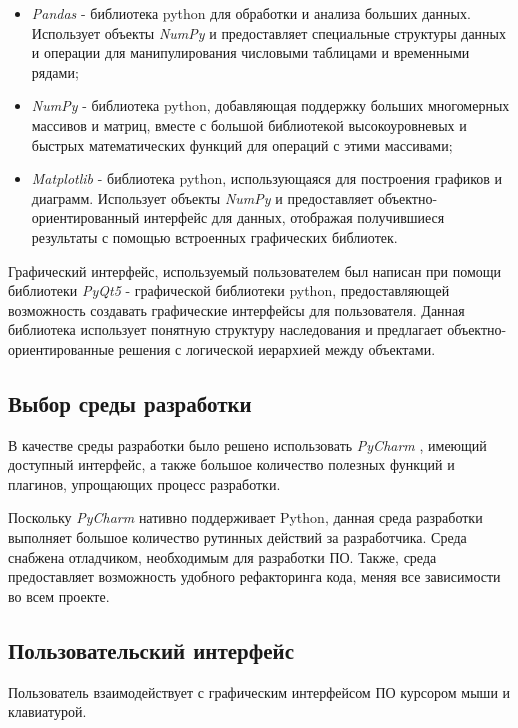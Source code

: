 \documentclass[utf8x, 14pt, oneside, a4paper]{article}
\begin{document}
	\begin{itemize}
		\item \textit{Pandas} - библиотека python для обработки и анализа больших данных. Использует объекты \textit{NumPy} и предоставляет специальные структуры данных и операции для манипулирования числовыми таблицами и временными рядами;
		\item \textit{NumPy} - библиотека python, добавляющая поддержку больших многомерных массивов и матриц, вместе с большой библиотекой высокоуровневых и быстрых математических функций для операций с этими массивами;
		\item \textit{Matplotlib} - библиотека python, использующаяся для построения графиков и диаграмм. Использует объекты \textit{NumPy} и предоставляет объектно- \linebreak ориентированный интерфейс для данных, отображая получившиеся результаты с помощью встроенных графических библиотек.
	\end{itemize}

	Графический интерфейс, используемый пользователем был написан при помощи библиотеки \textit{PyQt5} \cite{pyqt5} - графической библиотеки python, предоставляющей возможность создавать графические интерфейсы для пользователя. Данная библиотека использует понятную структуру наследования и предлагает \linebreak объектно-ориентированные решения с логической иерархией между объектами.
	
	\subsection{Выбор среды разработки}
	
	В качестве среды разработки было решено использовать \textit{PyCharm} \cite{pycharm}, имеющий доступный интерфейс, а также большое количество полезных функций и плагинов, упрощающих процесс разработки.
	
	Поскольку \textit{PyCharm} нативно поддерживает Python, данная среда разработки выполняет большое количество рутинных действий за разработчика. Среда снабжена отладчиком, необходимым для разработки ПО. Также, среда предоставляет возможность удобного рефакторинга кода, меняя все зависимости во всем проекте.
	
	\subsection{Пользовательский интерфейс}
	
	Пользователь взаимодействует с графическим интерфейсом ПО курсором мыши и клавиатурой.
	
\end{document}
